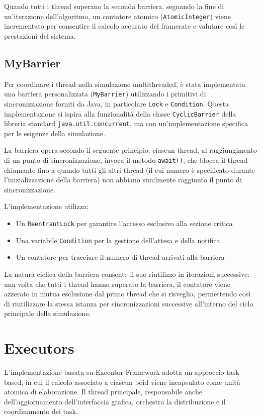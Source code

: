 \documentclass[a4paper,12pt]{report}
\begin{document}
Quando tutti i thread superano la seconda barriera, segnando la fine di un'iterazione dell'algoritmo, un contatore atomico (\texttt{AtomicInteger}) viene incrementato per consentire il calcolo accurato del framerate e valutare così le prestazioni del sistema.

\subsection{MyBarrier}
Per coordinare i thread nella simulazione multithreaded, è stata implementata una barriera personalizzata (\texttt{MyBarrier}) utilizzando i primitivi di sincronizzazione forniti da Java, in particolare \texttt{Lock} e \texttt{Condition}. Questa implementazione si ispira alla funzionalità della classe \texttt{CyclicBarrier} della libreria standard \texttt{java.util.concurrent}, ma con un'implementazione specifica per le esigenze della simulazione.

La barriera opera secondo il seguente principio: ciascun thread, al raggiungimento di un punto di sincronizzazione, invoca il metodo \texttt{await()}, che blocca il thread chiamante fino a quando tutti gli altri thread (il cui numero è specificato durante l'inizializzazione della barriera) non abbiano similmente raggiunto il punto di sincronizzazione.

L'implementazione utilizza:
\begin{itemize}
    \item Un \texttt{ReentrantLock} per garantire l'accesso esclusivo alla sezione critica
    \item Una variabile \texttt{Condition} per la gestione dell'attesa e della notifica
    \item Un contatore per tracciare il numero di thread arrivati alla barriera
\end{itemize}

La natura ciclica della barriera consente il suo riutilizzo in iterazioni successive: una volta che tutti i thread hanno superato la barriera, il contatore viene azzerato in mutua esclusione dal primo thread che si risveglia, permettendo così di riutilizzare la stessa istanza per sincronizzazioni successive all'interno del ciclo principale della simulazione.

\section{Executors}

L'implementazione basata su Executor Framework adotta un approccio task-based, in cui il calcolo associato a ciascun boid viene incapsulato come unità atomica di elaborazione. Il thread principale, responsabile anche dell'aggiornamento dell'interfaccia grafica, orchestra la distribuzione e il coordinamento dei task.
\end{document}
